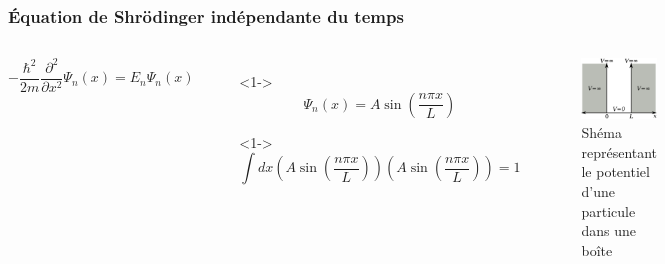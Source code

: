 \documentclass{beamer}
\begin{document}
\begin{frame}
\frametitle{Équation de Shrödinger indépendante du temps}

\begin{columns}

\begin{equation}\tag{4}
-\frac{\hbar^2}{2m}\frac{\partial^2}{\partial x^2}\Psi_n(x)=E_n\Psi_n(x)
\end{equation} 

\begin{itemize}
\item[]<1-> \begin{equation}\tag{5}
\Psi_n(x)=A\sin(\frac{n\pi x}{L})
\end{equation}  
\item[]<1-> \begin{equation}\tag{6}
\int dx (A\sin(\frac{n\pi x}{L}))(A\sin(\frac{n\pi x}{L}))=1
\end{equation}  
\end{itemize}
\begin{figure}
\includegraphics[scale=0.4]{Pot}
\caption{Shéma représentant le potentiel d'une particule dans une boîte}
\end{figure}
\end{columns}

\end{frame}
\end{document}
